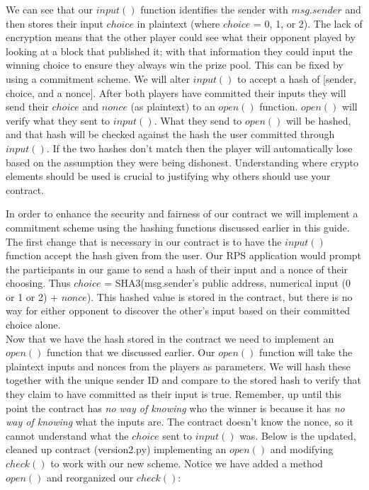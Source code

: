 \documentclass[12pt]{article}
\begin{document}
We can see that our $input()$ function identifies the sender with $msg.sender$ and then stores their input $choice$ in plaintext (where $choice$ = 0, 1, or 2). The lack of encryption means that the other player could see what their opponent played by looking at a block that published it; with that information they could input the winning choice to ensure they always win the prize pool. This can be fixed by using a commitment scheme. We will alter $input()$ to accept a hash of [sender, choice, and a nonce]. After both players have committed their inputs they will send their $choice$ and $nonce$ (as plaintext) to an $open()$ function. $open()$ will verify what they sent to $input()$. What they send to $open()$ will be hashed, and that hash will be checked against the hash the user committed through $input()$. If the two hashes don't match then the player will automatically lose based on the assumption they were being dishonest. Understanding where crypto elements should be used is crucial to justifying why others should use your contract. 

In order to enhance the security and fairness of our contract we will implement a commitment scheme using the hashing functions discussed earlier in this guide. The first change that is necessary in our contract is to have the $input()$ function accept the hash given from the user. Our RPS application would prompt the participants in our game to send a hash of their input and a nonce of their choosing. Thus $choice$ = SHA3(msg.sender's public address, numerical input (0 or 1 or 2) + $nonce$). This hashed value is stored in the contract, but there is no way for either opponent to discover the other's input based on their committed choice alone.\\

Now that we have the hash stored in the contract we need to implement an $open()$ function that we discussed earlier. Our $open()$ function will take the plaintext inputs and nonces from the players as parameters. We will hash these together with the unique sender ID and compare to the stored hash to verify that they claim to have committed as their input is true. Remember, up until this point the contract has \textit{no way of knowing} who the winner is because it has \textit{no way of knowing} what the inputs are. The contract doesn't know the nonce, so it cannot understand what the $choice$ sent to $input()$ was. Below is the updated, cleaned up contract (version2.py) implementing an $open()$ and modifying $check()$ to work with our new scheme. Notice we have added a method $open()$ and reorganized our $check()$:
\end{document}
